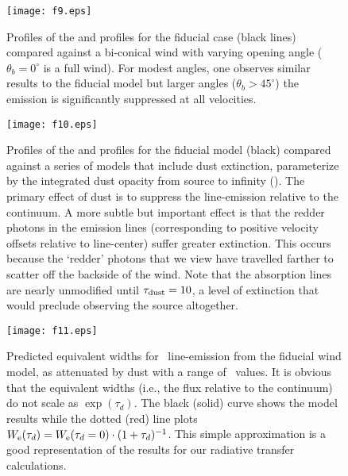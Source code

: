 \documentclass[12pt,preprint]{aastex}
\begin{document}
\begin{figure}
\texttt{[image: f9.eps]}
\caption{
Profiles of the  and  profiles for the fiducial
case (black lines) compared against a bi-conical wind with varying
opening angle ($\theta_b = 0^\circ$ is a full wind).  For modest angles, one
observes similar results to the fiducial model but larger angles
($\theta_b > 45^\circ$) the emission is significantly suppressed at
all velocities.  
}
\label{fig:biconical}
\end{figure}

\begin{figure}
\texttt{[image: f10.eps]}
\caption{
Profiles of the  and  profiles for the fiducial
model (black) compared against a series of models that include 
dust extinction, parameterize by the integrated dust opacity from
source to infinity (\taud).  The primary effect of dust is to suppress 
the line-emission relative to the continuum. 
A more subtle but important effect is that the redder photons in the
emission lines (corresponding to positive velocity offsets relative to
line-center) suffer greater extinction.  
This occurs because the `redder' photons that we view have travelled 
farther to scatter off the backside of the wind.  Note that
the absorption lines are nearly unmodified until $\tau_{\rm dust} = 10$, a
level of extinction that would preclude observing the source
altogether.
}
\label{fig:dust}
\end{figure}

\begin{figure}
\texttt{[image: f11.eps]}
\caption{
Predicted equivalent widths for \mgiib\ line-emission from the
fiducial wind model, as attenuated by dust with a range of \taud\
values.  
It is obvious that the equivalent widths (i.e., the flux relative to
the continuum) do not scale as $\exp(\tau_d)$.
The black (solid) curve shows the model results while the
dotted (red) line plots $W_{\rm e}(\tau_d) = W_{\rm e}(\tau_d = 0)
\cdot (1+\tau_d)^{-1}$.  This simple approximation is a good
representation of the results for our radiative transfer calculations.   
}
\label{fig:dust_tau}
\end{figure}
\end{document}
